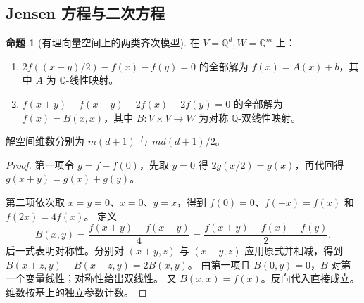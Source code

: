 \documentclass[UTF8,11pt,a4paper]{ctexart}
\theoremstyle{definition}
\newtheorem{proposition}[theorem]{命题}
\newcommand{\Q}{\mathbb Q}
\begin{document}
\subsection{Jensen 方程与二次方程}
\begin{proposition}[有理向量空间上的两类齐次模型]
在 $V=\Q^d,W=\Q^m$ 上：
\begin{enumerate}
\item $2f((x+y)/2)-f(x)-f(y)=0$ 的全部解为 $f(x)=A(x)+b$，其中 $A$ 为 $\Q$-线性映射。
\item $f(x+y)+f(x-y)-2f(x)-2f(y)=0$ 的全部解为 $f(x)=B(x,x)$，其中 $B:V\times V\to W$ 为对称 $\Q$-双线性映射。
\end{enumerate}
解空间维数分别为 $m(d+1)$ 与 $m d(d+1)/2$。
\end{proposition}
\begin{proof}
第一项令 $g=f-f(0)$，先取 $y=0$ 得 $2g(x/2)=g(x)$，再代回得 $g(x+y)=g(x)+g(y)$。

第二项依次取 $x=y=0$、$x=0$、$y=x$，得到 $f(0)=0$、$f(-x)=f(x)$ 和 $f(2x)=4f(x)$。
定义
\[
 B(x,y)=\frac{f(x+y)-f(x-y)}4
       =\frac{f(x+y)-f(x)-f(y)}2.
\]
后一式表明对称性。分别对 $(x+y,z)$ 与 $(x-y,z)$ 应用原式并相减，得到
$B(x+z,y)+B(x-z,y)=2B(x,y)$。
由第一项且 $B(0,y)=0$，$B$ 对第一个变量线性；对称性给出双线性。
又 $B(x,x)=f(x)$。反向代入直接成立。维数按基上的独立参数计数。
\end{proof}
\end{document}
